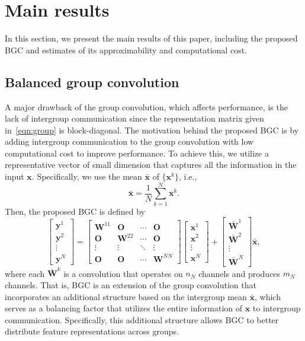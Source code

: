 \documentclass[10pt,a4paper]{amsart}
\numberwithin{equation}{section}
\theoremstyle{remark}
\newcommand\bO{\mathbf{O}}
\newcommand\bW{\mathbf{W}}
\newcommand\bx{\mathbf{x}}
\newcommand\by{\mathbf{y}}
\begin{document}
\section{Main results}
\label{Sec:Main}
In this section, we present the main results of this paper, including the proposed BGC and estimates of its approximability and computational cost.

\subsection{Balanced group convolution}
A major drawback of the group convolution, which affects performance, is the lack of intergroup communication since the representation matrix given in~\eqref{eqn:group} is block-diagonal.
The motivation behind the proposed BGC is by adding intergroup communication to the group convolution with low computational cost to improve performance.
To achieve this, we utilize a representative vector of small dimension that captures all the information in the input $\bx$. 
Specifically, we use the mean $\bar{\bx}$ of $\{ \bx^k \}$, i.e.,
\begin{equation*}
    \bar{\bx} = \frac{1}{N}\sum_{k=1}^N \bx^k.
\end{equation*}
Then, the proposed BGC is defined by
\begin{equation}
    \label{eqn:balanced}
    \begin{bmatrix} \by^1 \\ \by^2 \\ \vdots \\ \by^N \end{bmatrix}
    = \begin{bmatrix} \bW^{11} & \bO & \cdots & \bO \\
        \bO & \bW^{22} & \cdots & \bO \\
        \vdots & \vdots & \ddots & \vdots \\
        \bO & \bO & \cdots & \bW^{NN} \end{bmatrix}
    \begin{bmatrix} \bx^1 \\ \bx^2 \\ \vdots \\ \bx^N \end{bmatrix}
    + \begin{bmatrix} \bar{\bW}^1 \\ \bar{\bW}^2 \\ \vdots \\ \bar{\bW}^N \end{bmatrix}
    \bar{\bx},
\end{equation}
where each $\bar{\bW}^k$ is a convolution that operates on $n_N$ channels and produces $m_N$ channels.
That is, BGC is an extension of the group convolution that incorporates an additional structure based on the intergroup mean $\bar{\bx}$, which serves as a balancing factor that utilizes the entire information of $\bx$ to intergroup communication.
Specifically, this additional structure allows BGC to better distribute feature representations across groups.
\end{document}
